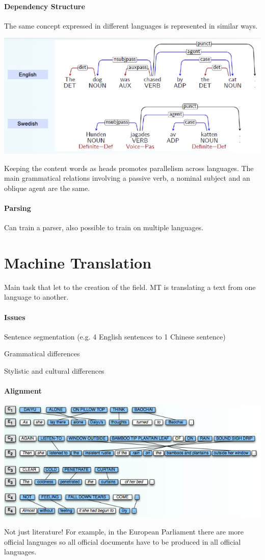 \documentclass[10pt]{report}
\begin{document}
\paragraph{Dependency Structure} The same concept expressed in different languages is represented in similar ways.
\begin{center}
	\includegraphics[scale=0.5]{40.png}
\end{center}
Keeping the content words as heads promotes parallelism across languages. The main grammatical relations involving a passive verb, a nominal subject and an oblique agent are the same.
\paragraph{Parsing}
Can train a parser, also possible to train on multiple languages.
\section{Machine Translation}
Main task that let to the creation of the field. MT is translating a text from one language to another.
\paragraph{Issues}
\begin{list}{}{}
	\item Sentence segmentation (e.g. 4 English sentences to 1 Chinese sentence)
	\item Grammatical differences
	\item Stylistic and cultural differences 
\end{list}
\paragraph{Alignment}
\begin{center}
	\includegraphics[scale=0.5]{61.png}
\end{center}
Not just literature! For example, in the European Parliament there are more official languages so all official documents have to be produced in all official languages.
\end{document}
